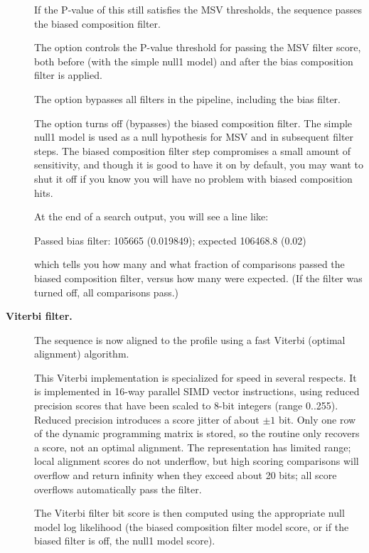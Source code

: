 \begin{description}
 If the P-value of this still satisfies the MSV thresholds, the
 sequence passes the biased composition filter. 

 The  option controls the P-value threshold for
 passing the MSV filter score, both before (with the simple null1
 model) and after the bias composition filter is applied.

 The  option bypasses all filters in the pipeline,
 including the bias filter.

 The  option turns off (bypasses) the biased
 composition filter.  The simple null1 model is used as a null
 hypothesis for MSV and in subsequent filter steps. The biased
 composition filter step compromises a small amount of sensitivity,
 and though it is good to have it on by default, you may want to shut
 it off if you know you will have no problem with biased composition
 hits.

 At the end of a search output, you will see a line like:

\begin{sreoutput}
 Passed bias filter:                   105665  (0.019849); expected 106468.8 (0.02)
\end{sreoutput}

 which tells you how many and what fraction of comparisons passed the
 biased composition filter, versus how many were expected. (If the
 filter was turned off, all comparisons pass.)

\item[\textbf{Viterbi filter.}]
 The sequence is now aligned to the profile using a fast Viterbi
 (optimal alignment) algorithm. 

 This Viterbi implementation is specialized for speed in several
 respects. It is implemented in 16-way parallel SIMD vector
 instructions, using reduced precision scores that have been scaled to
 8-bit integers (range 0..255). Reduced precision introduces a score
 jitter of about $\pm 1$ bit. Only one row of the dynamic programming
 matrix is stored, so the routine only recovers a score, not an
 optimal alignment. The representation has limited range; local
 alignment scores do not underflow, but high scoring comparisons will
 overflow and return infinity when they exceed about 20 bits; all
 score overflows automatically pass the filter.

 The Viterbi filter bit score is then computed using the appropriate
 null model log likelihood (the biased composition filter model score,
 or if the biased filter is off, the null1 model score).


\end{description}

